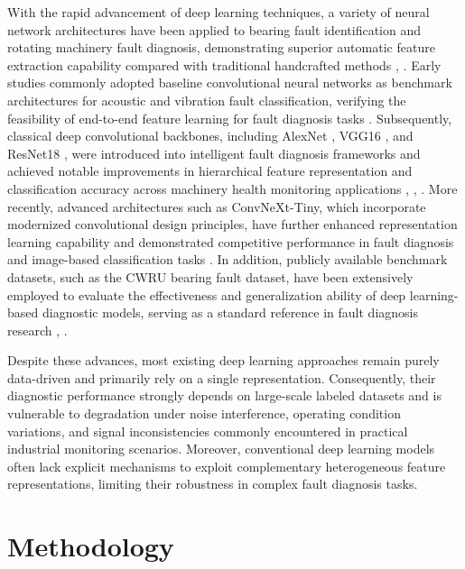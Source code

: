 \documentclass[journal]{IEEEtran}
\begin{document}
With the rapid advancement of deep learning techniques, a variety of neural network architectures have been applied to bearing fault identification and rotating machinery fault diagnosis, demonstrating superior automatic feature extraction capability compared with traditional handcrafted methods \cite{18184994}, \cite{7033433}. Early studies commonly adopted baseline convolutional neural networks as benchmark architectures for acoustic and vibration fault classification, verifying the feasibility of end-to-end feature learning for fault diagnosis tasks \cite{ahsanEnhancedFaultDiagnosis2025}. Subsequently, classical deep convolutional backbones, including AlexNet \cite{guNovelFaultDiagnosis2022}, VGG16 \cite{zhangFaultDiagnosisRecognition2024}, and ResNet18 \cite{maBearingFaultDiagnosis2024}, were introduced into intelligent fault diagnosis frameworks and achieved notable improvements in hierarchical feature representation and classification accuracy across machinery health monitoring applications \cite{11014495}, \cite{5352306}, \cite{4717246}. More recently, advanced architectures such as ConvNeXt-Tiny, which incorporate modernized convolutional design principles, have further enhanced representation learning capability and demonstrated competitive performance in fault diagnosis and image-based classification tasks \cite{zhangWaveConvNeXtEfficientPrecise2024}. In addition, publicly available benchmark datasets, such as the CWRU bearing fault dataset, have been extensively employed to evaluate the effectiveness and generalization ability of deep learning-based diagnostic models, serving as a standard reference in fault diagnosis research \cite{alonso-gonzalezBearingFaultDiagnosis2023}, \cite{zhangMachineLearningBased2021}.

Despite these advances, most existing deep learning approaches remain purely data-driven and primarily rely on a single representation. Consequently, their diagnostic performance strongly depends on large-scale labeled datasets and is vulnerable to degradation under noise interference, operating condition variations, and signal inconsistencies commonly encountered in practical industrial monitoring scenarios. Moreover, conventional deep learning models often lack explicit mechanisms to exploit complementary heterogeneous feature representations, limiting their robustness in complex fault diagnosis tasks.

\section{Methodology}
\label{section3}
\end{document}
